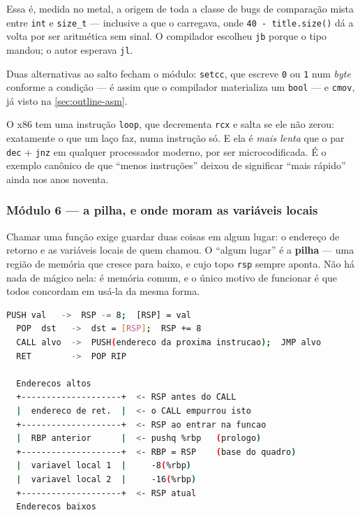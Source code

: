 Essa é, medida no metal, a origem de toda a classe de bugs de comparação mista
entre \texttt{int} e \texttt{size\_t} --- inclusive a que o 
carregava, onde \texttt{40 - title.size()} dá a volta por ser aritmética sem
sinal. O compilador escolheu \texttt{jb} porque o tipo mandou; o autor esperava
\texttt{jl}.

Duas alternativas ao salto fecham o módulo: \texttt{setcc}, que escreve
\texttt{0} ou \texttt{1} num \emph{byte} conforme a condição --- é assim que o
compilador materializa um \texttt{bool} --- e \texttt{cmov}, já visto na
\cref{sec:outline-asm}.

\begin{armadilha}
O x86 tem uma instrução \texttt{loop}, que decrementa \texttt{rcx} e salta se
ele não zerou: exatamente o que um laço faz, numa instrução só. E ela é
\emph{mais lenta} que o par \texttt{dec} + \texttt{jnz} em qualquer processador
moderno, por ser microcodificada. É o exemplo canônico de que ``menos
instruções'' deixou de significar ``mais rápido'' ainda nos anos noventa.
\end{armadilha}

\subsubsection{Módulo 6 --- a pilha, e onde moram as variáveis locais}

\begin{porque}
Chamar uma função exige guardar duas coisas em algum lugar: o endereço de
retorno e as variáveis locais de quem chamou. O ``algum lugar'' é a
\textbf{pilha} --- uma região de memória que cresce para baixo, e cujo topo
\texttt{rsp} sempre aponta. Não há nada de mágico nela: é memória comum, e o
único motivo de funcionar é que todos concordam em usá-la da mesma forma.
\end{porque}

\begin{lstlisting}[style=bt, language=bash,
    caption={As quatro instruções da pilha e o quadro que elas montam (resumo de
             (de \texttt{src/asm\_course/06\_stack\_frames.cpp}).}]
  PUSH val   ->  RSP -= 8;  [RSP] = val
  POP  dst   ->  dst = [RSP];  RSP += 8
  CALL alvo  ->  PUSH(endereco da proxima instrucao);  JMP alvo
  RET        ->  POP RIP

  Enderecos altos
  +--------------------+  <- RSP antes do CALL
  |  endereco de ret.  |  <- o CALL empurrou isto
  +--------------------+  <- RSP ao entrar na funcao
  |  RBP anterior      |  <- pushq %rbp   (prologo)
  +--------------------+  <- RBP = RSP    (base do quadro)
  |  variavel local 1  |     -8(%rbp)
  |  variavel local 2  |     -16(%rbp)
  +--------------------+  <- RSP atual
  Enderecos baixos
\end{lstlisting}

